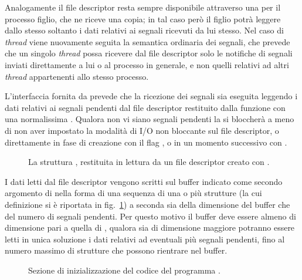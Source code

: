 Analogamente il file descriptor resta sempre disponibile attraverso una
 per il processo figlio, che ne riceve una copia; in tal caso però
il figlio potrà leggere dallo stesso soltanto i dati relativi ai segnali
ricevuti da lui stesso. Nel caso di \textit{thread} viene nuovamente seguita
la semantica ordinaria dei segnali, che prevede che un singolo \textit{thread}
possa ricevere dal file descriptor solo le notifiche di segnali inviati
direttamente a lui o al processo in generale, e non quelli relativi ad altri
\textit{thread} appartenenti allo stesso processo.

L'interfaccia fornita da  prevede che la ricezione dei segnali
sia eseguita leggendo i dati relativi ai segnali pendenti dal file descriptor
restituito dalla funzione con una normalissima .  Qualora non vi
siano segnali pendenti la  si bloccherà a meno di non aver
impostato la modalità di I/O non bloccante sul file descriptor, o direttamente
in fase di creazione con il flag , o in un momento
successivo con .  

\begin{figure}[!htb]
  \footnotesize \centering
  \begin{minipage}[c]{0.95\textwidth}
  \end{minipage} 
  \normalsize 
  \caption{La struttura , restituita in lettura da
    un file descriptor creato con .}
  \label{fig:signalfd_siginfo}
\end{figure}

I dati letti dal file descriptor vengono scritti sul buffer indicato come
secondo argomento di  nella forma di una sequenza di una o più
strutture  (la cui definizione si è riportata in
fig.~\ref{fig:signalfd_siginfo}) a seconda sia della dimensione del buffer che
del numero di segnali pendenti. Per questo motivo il buffer deve essere almeno
di dimensione pari a quella di , qualora sia di
dimensione maggiore potranno essere letti in unica soluzione i dati relativi
ad eventuali più segnali pendenti, fino al numero massimo di strutture
 che possono rientrare nel buffer.

\begin{figure}[!htb]
  \footnotesize \centering
  \begin{minipage}[c]{\codesamplewidth}
  \end{minipage} 
  \normalsize 
  \caption{Sezione di inizializzazione del codice del programma
    .}
  \label{fig:fiforeporter_code_init}
\end{figure}


